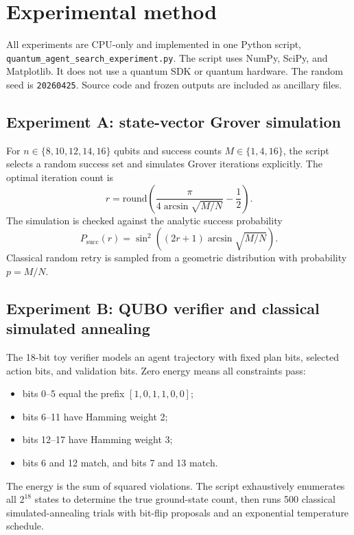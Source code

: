 \documentclass[11pt]{article}
\begin{document}
\section{Experimental method}

All experiments are CPU-only and implemented in one Python script, \texttt{quantum\_agent\_search\_experiment.py}. The script uses NumPy, SciPy, and Matplotlib. It does not use a quantum SDK or quantum hardware. The random seed is \texttt{20260425}. Source code and frozen outputs are included as ancillary files.

\subsection{Experiment A: state-vector Grover simulation}

For $n\in\{8,10,12,14,16\}$ qubits and success counts $M\in\{1,4,16\}$, the script selects a random success set and simulates Grover iterations explicitly. The optimal iteration count is
\begin{equation}
  r=\mathrm{round}\left(\frac{\pi}{4\arcsin\sqrt{M/N}}-\frac{1}{2}\right).
\end{equation}
The simulation is checked against the analytic success probability
\begin{equation}
  P_{\mathrm{succ}}(r)=\sin^2\left((2r+1)\arcsin\sqrt{M/N}\right).
\end{equation}
Classical random retry is sampled from a geometric distribution with probability $p=M/N$.

\subsection{Experiment B: QUBO verifier and classical simulated annealing}

The 18-bit toy verifier models an agent trajectory with fixed plan bits, selected action bits, and validation bits. Zero energy means all constraints pass:
\begin{itemize}
  \item bits 0--5 equal the prefix $[1,0,1,1,0,0]$;
  \item bits 6--11 have Hamming weight 2;
  \item bits 12--17 have Hamming weight 3;
  \item bits 6 and 12 match, and bits 7 and 13 match.
\end{itemize}
The energy is the sum of squared violations. The script exhaustively enumerates all $2^{18}$ states to determine the true ground-state count, then runs 500 classical simulated-annealing trials with bit-flip proposals and an exponential temperature schedule.
\end{document}

